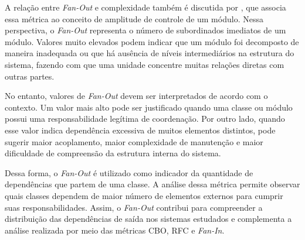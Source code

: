 A relação entre \textit{Fan-Out} e complexidade também é discutida por , que associa essa métrica ao 
conceito de amplitude de controle de um módulo. Nessa perspectiva, o \textit{Fan-Out} representa o número de subordinados 
imediatos de um módulo. Valores muito elevados podem indicar que um módulo foi decomposto de maneira inadequada ou que há 
ausência de níveis intermediários na estrutura do sistema, fazendo com que uma unidade concentre muitas relações diretas 
com outras partes.

No entanto, valores de \textit{Fan-Out} devem ser interpretados de acordo com o contexto. Um valor mais alto pode ser justificado 
quando uma classe ou módulo possui uma responsabilidade legítima de coordenação. Por outro lado, quando esse valor indica dependência 
excessiva de muitos elementos distintos, pode sugerir maior acoplamento, maior complexidade de manutenção e maior dificuldade de 
compreensão da estrutura interna do sistema.

Dessa forma, o \textit{Fan-Out} é utilizado como indicador da quantidade de dependências que partem de uma classe. 
A análise dessa métrica permite observar quais classes dependem de maior número de elementos externos para cumprir suas 
responsabilidades. Assim, o \textit{Fan-Out} contribui para compreender a distribuição das dependências de saída nos sistemas 
estudados e complementa a análise realizada por meio das métricas CBO, RFC e \textit{Fan-In}.
